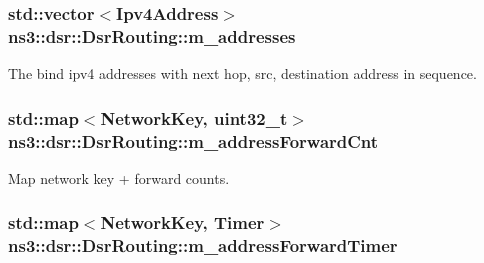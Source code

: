 \subsubsection[{\texorpdfstring{m\+\_\+addresses}{m_addresses}}]{\setlength{\rightskip}{0pt plus 5cm}std\+::vector$<${\bf Ipv4\+Address}$>$ ns3\+::dsr\+::\+Dsr\+Routing\+::m\+\_\+addresses\hspace{0.3cm}{\ttfamily [private]}}\hypertarget{classns3_1_1dsr_1_1DsrRouting_a350fab49fe12651b852fa42363684990}{}\label{classns3_1_1dsr_1_1DsrRouting_a350fab49fe12651b852fa42363684990}


The bind ipv4 addresses with next hop, src, destination address in sequence. 

\subsubsection[{\texorpdfstring{m\+\_\+address\+Forward\+Cnt}{m_addressForwardCnt}}]{\setlength{\rightskip}{0pt plus 5cm}std\+::map$<${\bf Network\+Key}, uint32\+\_\+t$>$ ns3\+::dsr\+::\+Dsr\+Routing\+::m\+\_\+address\+Forward\+Cnt\hspace{0.3cm}{\ttfamily [private]}}\hypertarget{classns3_1_1dsr_1_1DsrRouting_a5042f7e5df0470025fdb6023fcc24411}{}\label{classns3_1_1dsr_1_1DsrRouting_a5042f7e5df0470025fdb6023fcc24411}


Map network key + forward counts. 

\subsubsection[{\texorpdfstring{m\+\_\+address\+Forward\+Timer}{m_addressForwardTimer}}]{\setlength{\rightskip}{0pt plus 5cm}std\+::map$<${\bf Network\+Key}, {\bf Timer}$>$ ns3\+::dsr\+::\+Dsr\+Routing\+::m\+\_\+address\+Forward\+Timer\hspace{0.3cm}{\ttfamily [private]}}\hypertarget{classns3_1_1dsr_1_1DsrRouting_a4a35b13cdca413ab5bc0b1b3b7b78907}{}\label{classns3_1_1dsr_1_1DsrRouting_a4a35b13cdca413ab5bc0b1b3b7b78907}


